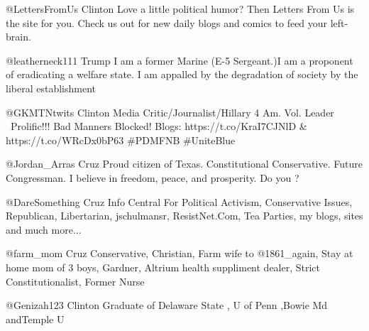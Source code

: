 @LettersFromUs 
Clinton
Love a little political humor? Then Letters From Us is the site for you. Check us out for new daily blogs and comics to feed your left-brain.

@leatherneck111 
Trump
I am a former Marine (E-5 Sergeant.)I am a proponent of eradicating a welfare state.  I am appalled by the degradation of society by the liberal establishment

@GKMTNtwits
Clinton
Media Critic/Journalist/Hillary 4 Am. Vol. Leader ~Prolific!!! Bad Manners Blocked! Blogs: https://t.co/KraI7CJNlD \& https://t.co/WRcDx0bP63 \#PDMFNB \#UniteBlue

@Jordan\_Arras
Cruz
Proud citizen of Texas. Constitutional Conservative. Future Congressman. I believe in freedom, peace, and prosperity. Do you ?

@DareSomething
Cruz
Info Central For Political Activism, Conservative Issues, Republican, Libertarian, jschulmansr, ResistNet.Com, Tea Parties, my blogs, sites and much more...

@farm\_mom
Cruz
Conservative, Christian, Farm wife to @1861\_again, Stay at home mom of 3 boys, Gardner, Altrium health suppliment dealer, Strict Constitutionalist, Former Nurse

@Genizah123 
Clinton
Graduate of Delaware State , U of Penn ,Bowie Md andTemple U




 

